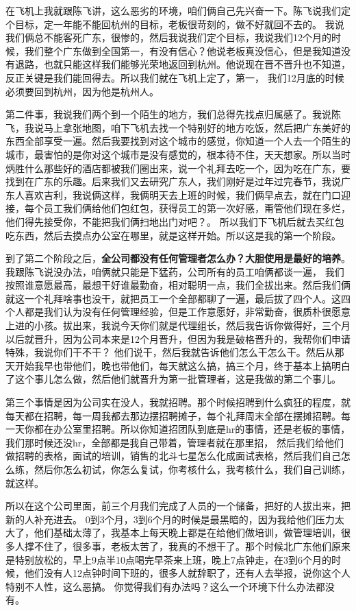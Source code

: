 \documentclass[12pt]{article}
\begin{document}
在飞机上我就跟陈飞讲，这么恶劣的环境，咱们俩自己先兴奋一下。陈飞说我们定个目标，定一年能不能回杭州的目标，老板很苛刻的，做不好就回不去的。 我说我们俩总不能客死广东，很惨的，然后我说我们定个目标，我说我们12个月的时候，我们整个广东做到全国第一，有没有信心？他说老板真没信心，但是我知道没有退路，也就只能这样我们能够光荣地返回到杭州。他说现在晋不晋升也不知道，反正关键是我们能回得去。所以我们就在飞机上定了，第一， 我们12月底的时候必须要回到杭州，因为他是杭州人。

第二件事，我说我们两个到一个陌生的地方，我们总得先找点归属感了。我说陈飞，我说马上拿张地图，咱下飞机去找一个特别好的地方吃饭，然后把广东美好的东西全部享受一遍。然后我要找到对这个城市的感觉，你知道一个人去一个陌生的城市，最害怕的是你对这个城市是没有感觉的，根本待不住，天天想家。所以当时炳胜什么那些好的酒店都被我们圈出来，说一个礼拜去吃一个，因为吃在广东，要找到在广东的乐趣。后来我们又去研究广东人，我们刚好是过年过完春节，我说广东人喜欢吉利，我说俩这样，我俩明天去上班的时候，我们俩早点去，就在门口迎接，每个员工我们俩给他们包红包，获得员工的第一次好感，甭管他们现在多烂，他们得先接受你，不能把我们俩扫地出门对吧？。 所以我们下飞机后就去买红包吃东西，然后去摸点办公室在哪里，就是这样开始。所以这是我的第一个阶段。

到了第二个阶段之后，\textbf{全公司都没有任何管理者怎么办？大胆使用是最好的培养}。我跟陈飞说没办法，咱俩就只能是下猛药，公司所有的员工咱俩都谈一遍， 我们按照谁意愿最高，最想干好谁最勤奋，相对聪明一点，我们全拔出来。然后我们俩就这一个礼拜啥事也没干，就把员工一个全部都聊了一遍，最后拔了四个人。这四个人都是我们认为没有任何管理经验，但是工作意愿好，非常勤奋，很质朴很愿意上进的小孩。拔出来，我说今天你们就是代理组长，然后我告诉你做得好，三个月以后就晋升，因为公司本来是12个月晋升，但因为我是破格晋升的，我帮你们申请特殊，我说你们干不干？ 他们说干，然后我就告诉他们怎么干怎么干。然后从那天开始我早也带他们，晚也带他们，每天就这么搞，搞三个月，终于基本上搞明白了这个事儿怎么做，然后他们就晋升为第一批管理者，这是我做的第二个事儿。

第三个事情是因为公司实在没人，我就招聘。那个时候招聘到什么疯狂的程度，就每天都在招聘，每一周我都去那边摆招聘摊子，每个礼拜周末全部在摆摊招聘。每一天你都在办公室里招聘。所以你知道招团队到底是hr的事情，还是老板的事情，我们那时候还没hr，全部都是我自己带着，管理者就在那里招， 然后我们给他们做招聘的表格，面试的培训，销售的北斗七星怎么化成面试表格，然后我们自己怎么练，然后你怎么初试，你怎么复试，你考核什么，我考核什么，我们自己训练，就这样。

所以在这个公司里面，前三个月我们完成了人员的一个储备，把好的人拔出来，把新的人补充进去。 0到3个月，3到6个月的时候是最黑暗的，因为我给他们压力太大了，他们基础太薄了，我基本上每天晚上都是在给他们做培训，做管理培训，很多人撑不住了，很多事，老板太苦了，我真的不想干了。那个时候北广东他们原来是特别放松的，早上9点半10点喝完早茶来上班，晚上7点钟走，在3到6个月的时候，他们没有人12点钟时间下班的，很多人就辞职了，还有人去举报，说你这个人特别不人性，这么恶搞。 你觉得我们有办法吗？这么一个环境下什么办法都没有。
\end{document}
